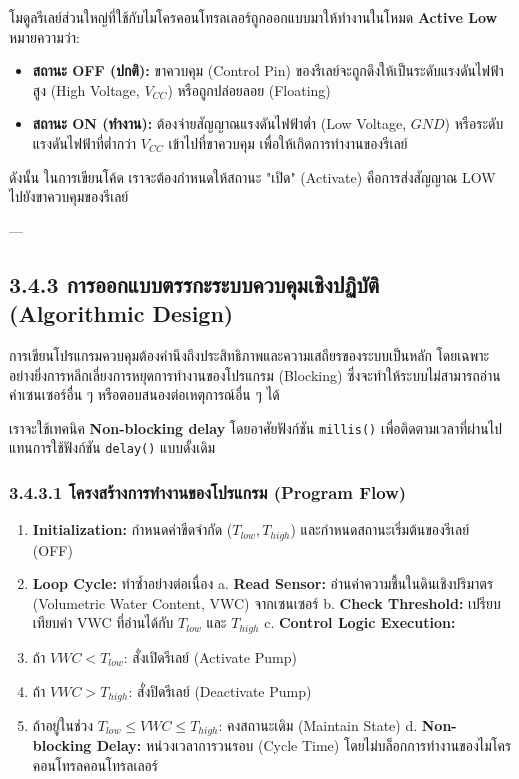 \documentclass[11pt,a4paper,openany]{report}
\begin{document}
โมดูลรีเลย์ส่วนใหญ่ที่ใช้กับไมโครคอนโทรลเลอร์ถูกออกแบบมาให้ทำงานในโหมด \textbf{Active Low} หมายความว่า:
\begin{itemize}
  \item \textbf{สถานะ OFF (ปกติ):} ขาควบคุม (Control Pin) ของรีเลย์จะถูกดึงให้เป็นระดับแรงดันไฟฟ้าสูง (High Voltage, $V_{CC}$) หรือถูกปล่อยลอย (Floating)
  \item \textbf{สถานะ ON (ทำงาน):} ต้องจ่ายสัญญาณแรงดันไฟฟ้าต่ำ (Low Voltage, $GND$) หรือระดับแรงดันไฟฟ้าที่ต่ำกว่า $V_{CC}$ เข้าไปที่ขาควบคุม เพื่อให้เกิดการทำงานของรีเลย์
\end{itemize}


ดังนั้น ในการเขียนโค้ด เราจะต้องกำหนดให้สถานะ "เปิด" (Activate) คือการส่งสัญญาณ LOW ไปยังขาควบคุมของรีเลย์

---

\subsection{3.4.3 การออกแบบตรรกะระบบควบคุมเชิงปฏิบัติ (Algorithmic Design)}


การเขียนโปรแกรมควบคุมต้องคำนึงถึงประสิทธิภาพและความเสถียรของระบบเป็นหลัก โดยเฉพาะอย่างยิ่งการหลีกเลี่ยงการหยุดการทำงานของโปรแกรม (Blocking) ซึ่งจะทำให้ระบบไม่สามารถอ่านค่าเซนเซอร์อื่น ๆ หรือตอบสนองต่อเหตุการณ์อื่น ๆ ได้

เราจะใช้เทคนิค \textbf{Non-blocking delay} โดยอาศัยฟังก์ชัน \texttt{millis()} เพื่อติดตามเวลาที่ผ่านไปแทนการใช้ฟังก์ชัน \texttt{delay()} แบบดั้งเดิม

\subsubsection{3.4.3.1 โครงสร้างการทำงานของโปรแกรม (Program Flow)}


\begin{enumerate}
  \item \textbf{Initialization:} กำหนดค่าขีดจำกัด ($T_{low}, T_{high}$) และกำหนดสถานะเริ่มต้นของรีเลย์ (OFF)
  \item \textbf{Loop Cycle:} ทำซ้ำอย่างต่อเนื่อง
  a. \textbf{Read Sensor:} อ่านค่าความชื้นในดินเชิงปริมาตร (Volumetric Water Content, VWC) จากเซนเซอร์
  b. \textbf{Check Threshold:} เปรียบเทียบค่า VWC ที่อ่านได้กับ $T_{low}$ และ $T_{high}$
  c. \textbf{Control Logic Execution:}
  \item ถ้า $VWC < T_{low}$: สั่งเปิดรีเลย์ (Activate Pump)
  \item ถ้า $VWC > T_{high}$: สั่งปิดรีเลย์ (Deactivate Pump)
  \item ถ้าอยู่ในช่วง $T_{low} \le VWC \le T_{high}$: คงสถานะเดิม (Maintain State)
  d. \textbf{Non-blocking Delay:} หน่วงเวลาการวนรอบ (Cycle Time) โดยไม่บล็อกการทำงานของไมโครคอนโทรลคอนโทรลเลอร์
\end{enumerate}
\end{document}
